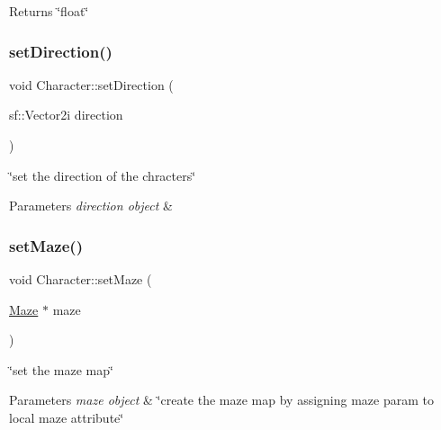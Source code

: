 \begin{DoxyReturn}{Returns}
\char`\"{}float\char`\"{} 
\end{DoxyReturn}
\mbox{\label{classCharacter_aa7ac14465f088f97e955be6a352a5e34}} 
\subsubsection{\texorpdfstring{set\+Direction()}{setDirection()}}
{\footnotesize\ttfamily void Character\+::set\+Direction (\begin{DoxyParamCaption}\item[{sf\+::\+Vector2i}]{direction }\end{DoxyParamCaption})}



\char`\"{}set the direction of the chracters\char`\"{} 


\begin{DoxyParams}{Parameters}
{\em direction object} & \\
\hline
\end{DoxyParams}
\mbox{\label{classCharacter_aba54445fcae47eff401d4c226675d9b4}} 
\subsubsection{\texorpdfstring{set\+Maze()}{setMaze()}}
{\footnotesize\ttfamily void Character\+::set\+Maze (\begin{DoxyParamCaption}\item[{\hyperlink{classMaze}{Maze} $\ast$}]{maze }\end{DoxyParamCaption})}



\char`\"{}set the maze map\char`\"{} 


\begin{DoxyParams}{Parameters}
{\em maze object} & \char`\"{}create the maze map by assigning maze param to local maze attribute\char`\"{} \\
\hline
\end{DoxyParams}
\mbox{\label{classCharacter_a0569c1aa9c37e7436083c0f301a205be}} 

